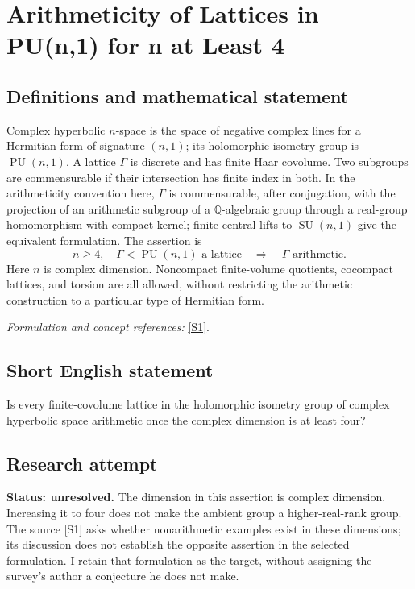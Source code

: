\documentclass[11pt]{article}
\begin{document}
\section*{\texorpdfstring{Arithmeticity of Lattices in PU(n,1) for n at Least 4}{Arithmeticity of Lattices in PU(n,1) for n at Least 4}}\label{30006877}
\subsection{Definitions and mathematical statement}
Complex hyperbolic $n$-space is the space of negative complex lines for a Hermitian form of signature $(n,1)$; its holomorphic isometry group is $\operatorname{PU}(n,1)$. A lattice $\Gamma$ is discrete and has finite Haar covolume. Two subgroups are commensurable if their intersection has finite index in both. In the arithmeticity convention here, $\Gamma$ is commensurable, after conjugation, with the projection of an arithmetic subgroup of a ${\mathbb{Q}}$-algebraic group through a real-group homomorphism with compact kernel; finite central lifts to $\operatorname{SU}(n,1)$ give the equivalent formulation. The assertion is
\[
 n\ge4,\quad\Gamma<\operatorname{PU}(n,1)\text{ a lattice}
 \quad\Longrightarrow\quad\Gamma\text{ arithmetic}.
\]
Here $n$ is complex dimension. Noncompact finite-volume quotients, cocompact lattices, and torsion are all allowed, without restricting the arithmetic construction to a particular type of Hermitian form.
\par\smallskip\textit{Formulation and concept references:} \href{https://www.maths.dur.ac.uk/users/j.r.parker/img/Lattices.pdf}{[S1]}.

\subsection{Short English statement}
Is every finite-covolume lattice in the holomorphic isometry group of complex hyperbolic space arithmetic once the complex dimension is at least four?
\subsection{Research attempt}
\textbf{Status: unresolved.} The dimension in this assertion is complex dimension. Increasing it to four does not make the ambient group a higher-real-rank group. The source [S1] asks whether nonarithmetic examples exist in these dimensions; its discussion does not establish the opposite assertion in the selected formulation. I retain that formulation as the target, without assigning the survey's author a conjecture he does not make.
\end{document}
